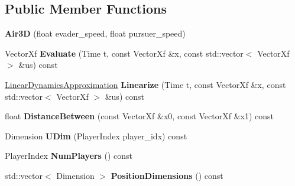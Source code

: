 \subsection*{Public Member Functions}
\begin{DoxyCompactItemize}
\item 
{\bfseries Air3D} (float evader\+\_\+speed, float pursuer\+\_\+speed)\hypertarget{classilqgames_1_1_air3_d_a8ac57cf8d227450e5dc4862cf0b640a6}{}\label{classilqgames_1_1_air3_d_a8ac57cf8d227450e5dc4862cf0b640a6}

\item 
Vector\+Xf {\bfseries Evaluate} (Time t, const Vector\+Xf \&x, const std\+::vector$<$ Vector\+Xf $>$ \&us) const \hypertarget{classilqgames_1_1_air3_d_a67aa22b5b20462f3d080fe879ad44758}{}\label{classilqgames_1_1_air3_d_a67aa22b5b20462f3d080fe879ad44758}

\item 
\hyperlink{structilqgames_1_1_linear_dynamics_approximation}{Linear\+Dynamics\+Approximation} {\bfseries Linearize} (Time t, const Vector\+Xf \&x, const std\+::vector$<$ Vector\+Xf $>$ \&us) const \hypertarget{classilqgames_1_1_air3_d_a8071e95d88f670e33e2e17a8a6d7e502}{}\label{classilqgames_1_1_air3_d_a8071e95d88f670e33e2e17a8a6d7e502}

\item 
float {\bfseries Distance\+Between} (const Vector\+Xf \&x0, const Vector\+Xf \&x1) const \hypertarget{classilqgames_1_1_air3_d_ae3831b42e3a97a71abea9d7b8b86b7c7}{}\label{classilqgames_1_1_air3_d_ae3831b42e3a97a71abea9d7b8b86b7c7}

\item 
Dimension {\bfseries U\+Dim} (Player\+Index player\+\_\+idx) const \hypertarget{classilqgames_1_1_air3_d_a1c339bd8572547a07e7928093fcb477a}{}\label{classilqgames_1_1_air3_d_a1c339bd8572547a07e7928093fcb477a}

\item 
Player\+Index {\bfseries Num\+Players} () const \hypertarget{classilqgames_1_1_air3_d_aa469f3a9aebb8d3fc48993d36fd168db}{}\label{classilqgames_1_1_air3_d_aa469f3a9aebb8d3fc48993d36fd168db}

\item 
std\+::vector$<$ Dimension $>$ {\bfseries Position\+Dimensions} () const \hypertarget{classilqgames_1_1_air3_d_a1ae92cabe2edef86bf3e9408716697cf}{}\label{classilqgames_1_1_air3_d_a1ae92cabe2edef86bf3e9408716697cf}

\end{DoxyCompactItemize}
